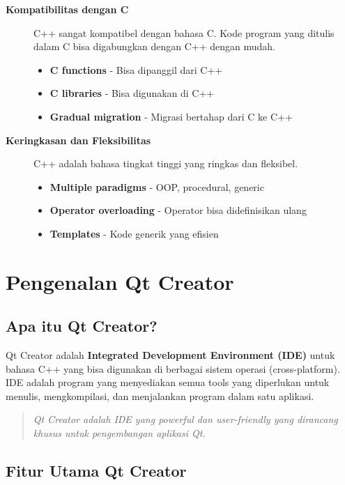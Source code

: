 \begin{description}
\item[\textbf{Kompatibilitas dengan C}]
C++ sangat kompatibel dengan bahasa C. Kode program yang ditulis dalam C bisa digabungkan dengan C++ dengan mudah.

\begin{itemize}
\item \textbf{C functions} - Bisa dipanggil dari C++
\item \textbf{C libraries} - Bisa digunakan di C++
\item \textbf{Gradual migration} - Migrasi bertahap dari C ke C++
\end{itemize}

\item[\textbf{Keringkasan dan Fleksibilitas}]
C++ adalah bahasa tingkat tinggi yang ringkas dan fleksibel.

\begin{itemize}
\item \textbf{Multiple paradigms} - OOP, procedural, generic
\item \textbf{Operator overloading} - Operator bisa didefinisikan ulang
\item \textbf{Templates} - Kode generik yang efisien
\end{itemize}

\end{description}

\section{Pengenalan Qt Creator}

\subsection{Apa itu Qt Creator?}

Qt Creator adalah \textbf{Integrated Development Environment (IDE)} untuk bahasa C++ yang bisa digunakan di berbagai sistem operasi (cross-platform). IDE adalah program yang menyediakan semua tools yang diperlukan untuk menulis, mengkompilasi, dan menjalankan program dalam satu aplikasi.

\begin{quote}
\textit{Qt Creator adalah IDE yang powerful dan user-friendly yang dirancang khusus untuk pengembangan aplikasi Qt.}
\end{quote}

\subsection{Fitur Utama Qt Creator}

